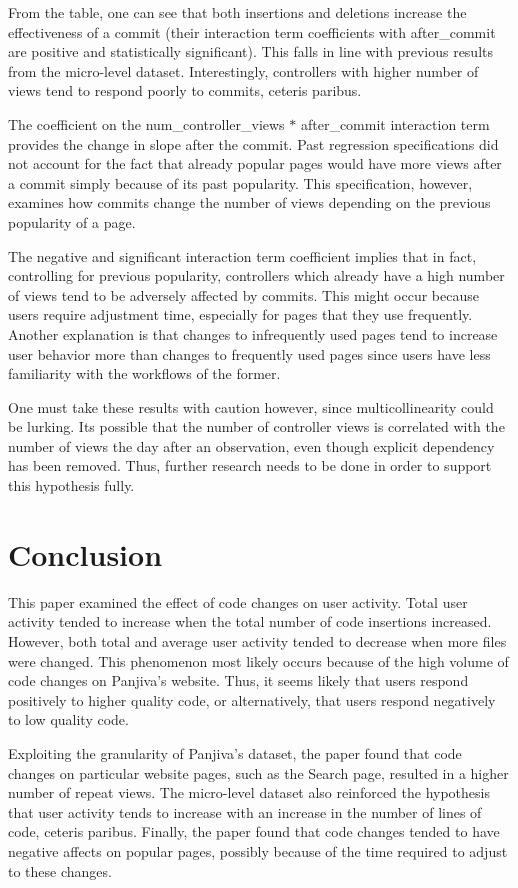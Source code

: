 \documentclass[12pt]{article}
\begin{document}
From the table, one can see that both insertions and deletions increase the effectiveness of a commit (their interaction term coefficients with after\_commit are positive and statistically significant). This falls in line with previous results from the micro-level dataset. Interestingly, controllers with higher number of views tend to respond poorly to commits, ceteris paribus. 

The coefficient on the num\_controller\_views $*$ after\_commit interaction term provides the change in slope after the commit. Past regression specifications did not account for the fact that already popular pages would have more views after a commit simply because of its past popularity. This specification, however, examines how commits change the number of views depending on the previous popularity of a page.

The negative and significant interaction term coefficient implies that in fact, controlling for previous popularity, controllers which already have a high number of views tend to be adversely affected by commits. This might occur because users require adjustment time, especially for pages that they use frequently. Another explanation is that changes to infrequently used pages tend to increase user behavior more than changes to frequently used pages since users have less familiarity with the workflows of the former.

One must take these results with caution however, since multicollinearity could be lurking. Its possible that the number of controller views is correlated with the number of views the day after an observation, even though explicit dependency has been removed. Thus, further research needs to be done in order to support this hypothesis fully.

\section{Conclusion}

This paper examined the effect of code changes on user activity. Total user activity tended to increase when the total number of code insertions increased. However, both total and average user activity tended to decrease when more files were changed. This phenomenon most likely occurs because of the high volume of code changes on Panjiva's website. Thus, it seems likely that users respond positively to higher quality code, or alternatively, that users respond negatively to low quality code. 

Exploiting the granularity of Panjiva's dataset, the paper found that code changes on particular website pages, such as the Search page, resulted in a higher number of repeat views. The micro-level dataset also reinforced the hypothesis that user activity tends to increase with an increase in the number of lines of code, ceteris paribus. Finally, the paper found that code changes tended to have negative affects on popular pages, possibly because of the time required to adjust to these changes.
\end{document}
